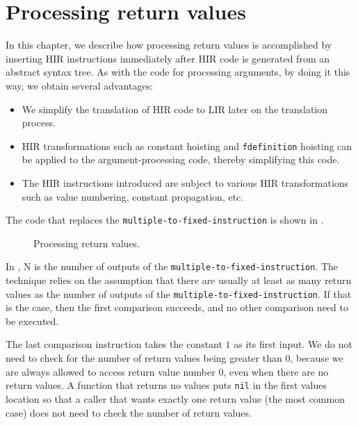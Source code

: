 \chapter{Processing return values}

In this chapter, we describe how processing return values is
accomplished by inserting HIR instructions immediately after HIR code
is generated from an abstract syntax tree.  As with the code for
processing arguments, by doing it this way, we obtain several
advantages:

\begin{itemize}
\item We simplify the translation of HIR code to LIR later on the
  translation process.
\item HIR transformations such as constant hoisting and
  \texttt{fdefinition} hoisting can be applied to the
  argument-processing code, thereby simplifying this code.
\item The HIR instructions introduced are subject to various HIR
  transformations such as value numbering, constant propagation,
  etc.
\end{itemize}

The code that replaces the \texttt{multiple-to-fixed-instruction} is
shown in .

\begin{figure}
\begin{center}
\end{center}
\caption{\label{fig-process-values}
Processing return values.}
\end{figure}

In , N is the number of outputs of the
\texttt{multiple-to-fixed-instruction}.  The technique relies on the
assumption that there are usually at least as many return values as
the number of outputs of the \texttt{multiple-to-fixed-instruction}.
If that is the case, then the first comparison succeeds, and no other
comparison need to be executed.

The last comparison instruction takes the constant $1$ as its first
input.  We do not need to check for the number of return values being
greater than $0$, because we are always allowed to access return value
number $0$, even when there are no return values.  A function that
returns no values puts \texttt{nil} in the first values location so
that a caller that wants exactly one return value (the most common
case) does not need to check the number of return values.
